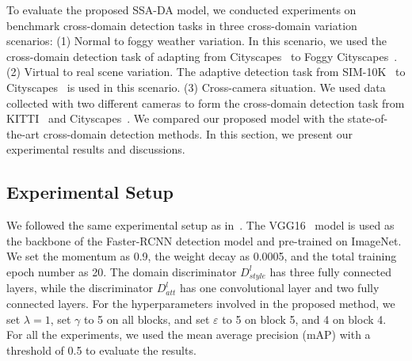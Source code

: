 \documentclass[runningheads]{llncs}
\begin{document}
To evaluate the proposed SSA-DA model, we conducted experiments 
on benchmark cross-domain detection tasks in three cross-domain variation scenarios: 
(1) {Normal to foggy weather variation}. 
In this scenario, we used the cross-domain detection task of adapting from
Cityscapes~\cite{cordts2016cityscapes} to Foggy Cityscapes~\cite{sakaridis2018semantic}.
(2) {Virtual to real scene variation}. The adaptive detection task from SIM-10K~\cite{JohnsonDriving} to Cityscapes~\cite{cordts2016cityscapes}
is used in this scenario. 
(3) {Cross-camera situation}. 
We used data collected with two different cameras to form the cross-domain detection task from KITTI~\cite{geiger2012we} and Cityscapes~\cite{cordts2016cityscapes}. 
We compared our proposed model with the state-of-the-art cross-domain detection methods. 
In this section, we present our experimental results and discussions. 

\subsection{Experimental Setup}
We followed the same experimental setup as in~\cite{chen2018domain}. 
The VGG16~\cite{simonyan2014very} model is used as the backbone of the Faster-RCNN detection model and pre-trained on ImageNet. 
We set the momentum as 0.9, the weight decay as 0.0005, and 
the total training epoch number as 20. 
The domain discriminator $D^l_{style}$ has three fully connected layers,
while the discriminator $D^l_{att}$ has one convolutional layer and two fully connected layers. 
For the hyperparameters involved in the proposed method, 
we set $\lambda=1$, set $\gamma$ to 5 on all blocks, and set $\varepsilon$ to 5 on block 5, and 4 on block 4. 
For all the experiments, we used the mean average precision (mAP) with a threshold of 0.5 to evaluate the results.
\end{document}
